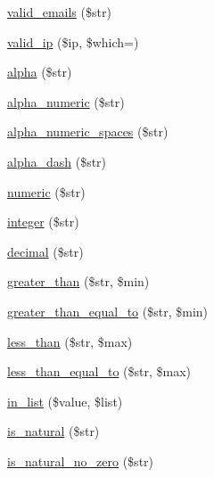 \begin{DoxyCompactItemize}
\item 
\mbox{\hyperlink{class_c_i___form__validation_a056b4fc668005c0bd99eb3ed095d89c2}{valid\+\_\+emails}} (\$str)
\item 
\mbox{\hyperlink{class_c_i___form__validation_a25df30cfb13139af0c64f1724b5a4e32}{valid\+\_\+ip}} (\$ip, \$which=\textquotesingle{}\textquotesingle{})
\item 
\mbox{\hyperlink{class_c_i___form__validation_a02269f4592c13d8746f6fab60074152a}{alpha}} (\$str)
\item 
\mbox{\hyperlink{class_c_i___form__validation_abc9704781aa812eb05ab7dcc26f2f497}{alpha\+\_\+numeric}} (\$str)
\item 
\mbox{\hyperlink{class_c_i___form__validation_ab3bf6ec6e90a952f4bda58f9f76fbb77}{alpha\+\_\+numeric\+\_\+spaces}} (\$str)
\item 
\mbox{\hyperlink{class_c_i___form__validation_a648f10fb78071945e641e3230bdf2a77}{alpha\+\_\+dash}} (\$str)
\item 
\mbox{\hyperlink{class_c_i___form__validation_a6935c4cbcdd7d55ac95d66a8a40e14bd}{numeric}} (\$str)
\item 
\mbox{\hyperlink{class_c_i___form__validation_a68bed0389598c75c06aff04c80624f7a}{integer}} (\$str)
\item 
\mbox{\hyperlink{class_c_i___form__validation_a532dbb64c5e3a5781528fb2d026c9ec1}{decimal}} (\$str)
\item 
\mbox{\hyperlink{class_c_i___form__validation_abb2356d0a98eed32c043709f444f651f}{greater\+\_\+than}} (\$str, \$min)
\item 
\mbox{\hyperlink{class_c_i___form__validation_a446649cb6ac9e0ca1f194211e64c5b14}{greater\+\_\+than\+\_\+equal\+\_\+to}} (\$str, \$min)
\item 
\mbox{\hyperlink{class_c_i___form__validation_ada70ef41a2c0b98c1cbeddf382465e23}{less\+\_\+than}} (\$str, \$max)
\item 
\mbox{\hyperlink{class_c_i___form__validation_ab091b87b960b6e1dcc4a6c2267f969c4}{less\+\_\+than\+\_\+equal\+\_\+to}} (\$str, \$max)
\item 
\mbox{\hyperlink{class_c_i___form__validation_a20bbfa76a5f1f526be8dab27db6f04f8}{in\+\_\+list}} (\$value, \$list)
\item 
\mbox{\hyperlink{class_c_i___form__validation_a75d34c2da83d6425bb0feb129f69400a}{is\+\_\+natural}} (\$str)
\item 
\mbox{\hyperlink{class_c_i___form__validation_aa5fc2c096f3bbe26bcef2c854aa26a04}{is\+\_\+natural\+\_\+no\+\_\+zero}} (\$str)
\item 

\end{DoxyCompactItemize}
